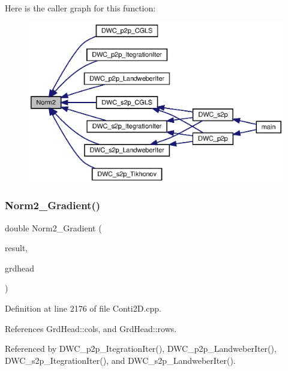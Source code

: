 Here is the caller graph for this function\+:\nopagebreak
\begin{figure}[H]
\begin{center}
\leavevmode
\includegraphics[width=350pt]{Conti2D_8cpp_a98827c14ed7072c96834f20205c7a916_a98827c14ed7072c96834f20205c7a916_icgraph}
\end{center}
\end{figure}
\mbox{\label{Conti2D_8cpp_a43fc3af75243a047d61aadea31c0fa9c_a43fc3af75243a047d61aadea31c0fa9c}} 
\subsubsection{Norm2\+\_\+\+Gradient()}
{\footnotesize\ttfamily double Norm2\+\_\+\+Gradient (\begin{DoxyParamCaption}\item[{double $\ast$}]{result,  }\item[{\textbf{ Grd\+Head}}]{grdhead }\end{DoxyParamCaption})}



Definition at line 2176 of file Conti2\+D.\+cpp.



References Grd\+Head\+::cols, and Grd\+Head\+::rows.



Referenced by D\+W\+C\+\_\+p2p\+\_\+\+Itegration\+Iter(), D\+W\+C\+\_\+p2p\+\_\+\+Landweber\+Iter(), D\+W\+C\+\_\+s2p\+\_\+\+Itegration\+Iter(), and D\+W\+C\+\_\+s2p\+\_\+\+Landweber\+Iter().

